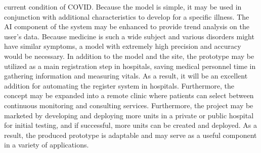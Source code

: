 \documentclass{bmcart}
\begin{document}
current condition of COVID. Because the model is simple, it may be used in
conjunction with additional characteristics to develop for a specific illness.
The AI component of the system may be enhanced to provide trend analysis on the
user's data. Because medicine is such a wide subject and various disorders might
have similar symptoms, a model with extremely high precision and accuracy would
be necessary. In addition to the model and the site, the prototype may be
utilized as a main registration step in hospitals, saving medical personnel time
in gathering information and measuring vitals. As a result, it will be an
excellent addition for automating the register system in hospitals. Furthermore,
the concept may be expanded into a remote clinic where patients can select
between continuous monitoring and consulting services. Furthermore, the project
may be marketed by developing and deploying more units in a private or public
hospital for initial testing, and if successful, more units can be created and
deployed. As a result, the produced prototype is adaptable and may serve as a
useful component in a variety of applications.

\end{document}
